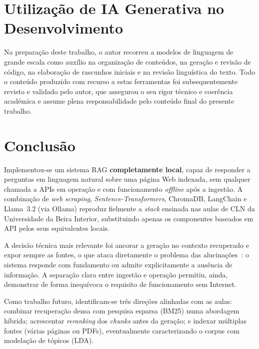 \documentclass[]{ceurart}
\begin{document}
\section{Utilização de IA Generativa no Desenvolvimento}

Na preparação deste trabalho, o autor recorreu a modelos de linguagem de grande
escala como auxílio na organização de conteúdos, na geração e revisão de código,
na elaboração de rascunhos iniciais e na revisão linguística do texto. Todo o
conteúdo produzido com recurso a estas ferramentas foi subsequentemente revisto
e validado pelo autor, que assegurou o seu rigor técnico e coerência académica e
assume plena responsabilidade pelo conteúdo final do presente trabalho.

\section{Conclusão}

Implementou-se um sistema RAG \textbf{completamente local}, capaz de responder a
perguntas em linguagem natural sobre uma página Web indexada, sem qualquer
chamada a APIs em operação e com funcionamento \emph{offline} após a ingestão. A
combinação de \emph{web scraping}, \emph{Sentence-Transformers}, ChromaDB,
LangChain e Llama~3.2 (via Ollama) reproduz fielmente a \emph{stack} ensinada nas
aulas de CLN da Universidade da Beira Interior, substituindo apenas os componentes baseados em API pelos seus
equivalentes locais.

A decisão técnica mais relevante foi ancorar a geração no contexto recuperado e
expor sempre as fontes, o que ataca diretamente o problema das
alucinações~\cite{ji2023hallucination}: o sistema responde com fundamento ou
admite explicitamente a ausência de informação. A separação clara entre ingestão
e operação permitiu, ainda, demonstrar de forma inequívoca o requisito de
funcionamento sem Internet.

Como trabalho futuro, identificam-se três direções alinhadas com as aulas:
combinar recuperação densa com pesquisa esparsa (BM25) numa abordagem híbrida;
acrescentar \emph{reranking} dos \emph{chunks} antes da geração; e indexar
múltiplas fontes (várias páginas ou PDFs), eventualmente caracterizando o corpus
com modelação de tópicos (LDA).
\end{document}
